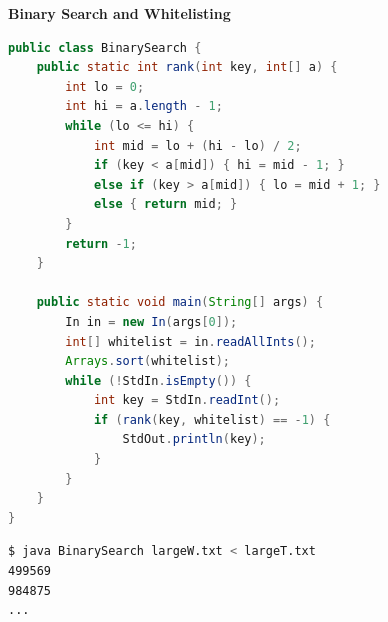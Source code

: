 \documentclass[8pt,a4paper,compress]{beamer}
\begin{document}
\begin{frame}[fragile]
\pause

\textbf{Binary Search and Whitelisting}

\begin{lstlisting}[language=Java]
public class BinarySearch {
    public static int rank(int key, int[] a) {
        int lo = 0;
        int hi = a.length - 1;
        while (lo <= hi) {
            int mid = lo + (hi - lo) / 2;
            if (key < a[mid]) { hi = mid - 1; }
            else if (key > a[mid]) { lo = mid + 1; }
            else { return mid; }
        }
        return -1;
    }

    public static void main(String[] args) {
        In in = new In(args[0]);
        int[] whitelist = in.readAllInts();
        Arrays.sort(whitelist);
        while (!StdIn.isEmpty()) {
            int key = StdIn.readInt();
            if (rank(key, whitelist) == -1) {
                StdOut.println(key);
            }
        }
    }
}
\end{lstlisting}

\begin{lstlisting}[language=bash]
$ java BinarySearch largeW.txt < largeT.txt
499569
984875
...
\end{lstlisting}

\end{frame}
\end{document}
